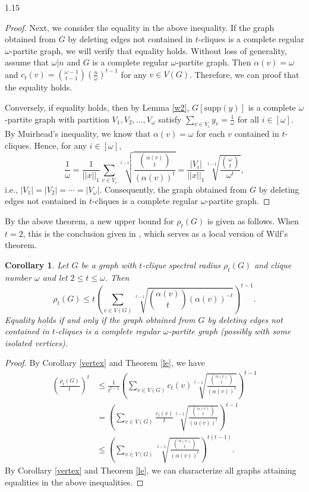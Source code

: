 \documentclass[preprint,12pt]{elsarticle1}
\newtheorem{cor}[thm]{Corollary}
\numberwithin{equation}{section}
\begin{document}
\begin{spacing}{1.15}
\begin{proof}
Next, we consider the equality in the above inequality.
If the graph obtained from $G$ by deleting edges not contained in $t$-cliques is a complete regular $\omega$-partite graph, we will verify that equality holds.
Without loss of generality, assume that $\omega|n$ and $G$ is a complete regular $\omega$-partite graph.
Then $\alpha(v)=\omega$ and $c_t(v)=\binom{\omega-1}{t-1}\left( \frac{n}{\omega} \right)^{t-1}$ for any $v\in V(G)$.
Therefore, we can proof that the equality holds.

Conversely, if equality holds, then by Lemma \ref{w2}, $G[\mathrm{supp}(y)]$ is a complete $\omega$-partite graph with partition $V_1, V_2, \ldots, V_{\omega}$ satisfy $\sum_{v\in V_i}y_v=\frac{1}{\omega}$ for all $i\in[\omega]$.
By Muirhead's inequality, we know that $\alpha(v)=\omega$ for each $v$ contained in $t$-cliques.
Hence, for any $i\in[\omega]$,
$$\frac{1}{\omega}=\frac{1}{||x||_1}\sum_{v\in V_i}\sqrt[t-1]{\frac{\binom{\alpha(v)}{t}}{\left(\alpha(v)\right)^t}}=\frac{|V_i|}{||x||_1}\sqrt[t-1]{\frac{\binom{\omega}{t}}{\omega^t}},$$
i.e., $|V_1|=|V_2|=\cdots=|V_{\omega}|$.
Consequently, the graph obtained from $G$ by deleting edges not contained in $t$-cliques is a complete regular $\omega$-partite graph.
\end{proof}

By the above theorem, a new upper bound for $\rho_{t}(G)$ is given as follows. When $t=2$, this is the conclusion given in \cite{liulelearxiv}, which serves as a local version of Wilf's theorem.

\begin{cor}\label{123}
Let $G$ be a graph with $t$-clique spectral radius $\rho_{t}(G)$ and clique number $\omega$ and let $2\le t\le\omega$. Then
$$\rho_{t}(G)\le t\left( \sum_{v\in V(G)} \sqrt[t-1]{\binom{\alpha(v)}{t}\left(\alpha(v)\right)^{-t}} \right)^{t-1} .$$
Equality holds if and only if the graph obtained from $G$ by deleting edges not contained in $t$-cliques is a complete regular $\omega$-partite graph (possibly with some isolated vertices).
\end{cor}

\begin{proof}
By Corollary \ref{vertex} and Theorem \ref{le}, we have
\begin{align*}
	\left( \frac{\rho_{t}(G)}{t} \right)^{t} & \le \frac{1}{t^{t-1}} \left( \sum_{v\in V(G)} c_{t}(v) \sqrt[t-1]{\frac{\binom{\alpha(v)}{t}}{\left(\alpha(v)\right)^t}} \right)^{t-1}\\
	& = \left( \sum_{v\in V(G)} \frac{c_{t}(v)}{t} \sqrt[t-1]{\frac{\binom{\alpha(v)}{t}}{\left(\alpha(v)\right)^t}} \right)^{t-1}\\
	& \le \left( \sum_{v\in V(G)}\sqrt[t-1]{\frac{\binom{\alpha(v)}{t}}{\left(\alpha(v)\right)^t}} \right)^{t(t-1)}.
\end{align*}
By Corollary \ref{vertex} and Theorem \ref{le}, we can characterize all graphs attaining equalities in the above inequalities.
\end{proof}


\end{spacing}
\end{document}

